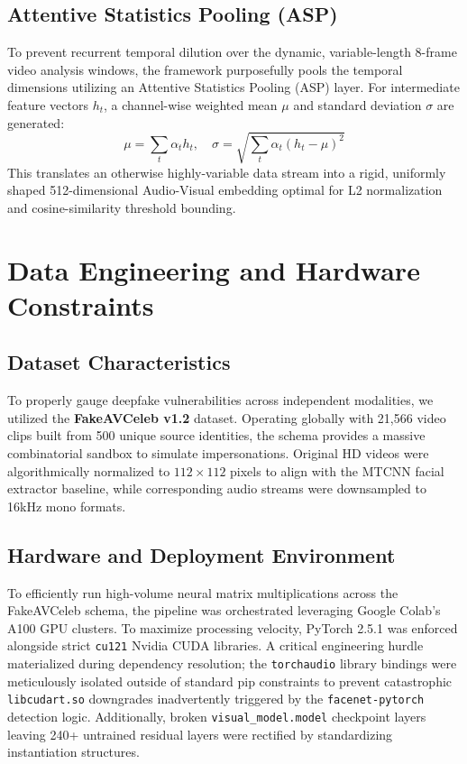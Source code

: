 \documentclass[conference]{IEEEtran}
\begin{document}
\subsection{Attentive Statistics Pooling (ASP)}
To prevent recurrent temporal dilution over the dynamic, variable-length $8$-frame video analysis windows, the framework purposefully pools the temporal dimensions utilizing an Attentive Statistics Pooling (ASP) layer. For intermediate feature vectors $h_t$, a channel-wise weighted mean $\mu$ and standard deviation $\sigma$ are generated:
\begin{equation}
    \mu = \sum_{t} \alpha_t h_t, \quad \sigma = \sqrt{\sum_{t} \alpha_t (h_t - \mu)^2}
\end{equation}
This translates an otherwise highly-variable data stream into a rigid, uniformly shaped 512-dimensional Audio-Visual embedding optimal for L2 normalization and cosine-similarity threshold bounding.

\section{Data Engineering and Hardware Constraints}

\subsection{Dataset Characteristics}
To properly gauge deepfake vulnerabilities across independent modalities, we utilized the \textbf{FakeAVCeleb v1.2} dataset. Operating globally with 21,566 video clips built from 500 unique source identities, the schema provides a massive combinatorial sandbox to simulate impersonations. Original HD videos were algorithmically normalized to $112 \times 112$ pixels to align with the MTCNN facial extractor baseline, while corresponding audio streams were downsampled to 16kHz mono formats. 

\subsection{Hardware and Deployment Environment}
To efficiently run high-volume neural matrix multiplications across the FakeAVCeleb schema, the pipeline was orchestrated leveraging Google Colab's A100 GPU clusters. To maximize processing velocity, PyTorch 2.5.1 was enforced alongside strict \texttt{cu121} Nvidia CUDA libraries. A critical engineering hurdle materialized during dependency resolution; the \texttt{torchaudio} library bindings were meticulously isolated outside of standard pip constraints to prevent catastrophic \texttt{libcudart.so} downgrades inadvertently triggered by the \texttt{facenet-pytorch} detection logic. Additionally, broken \texttt{visual\_model.model} checkpoint layers leaving 240+ untrained residual layers were rectified by standardizing instantiation structures.
\end{document}
